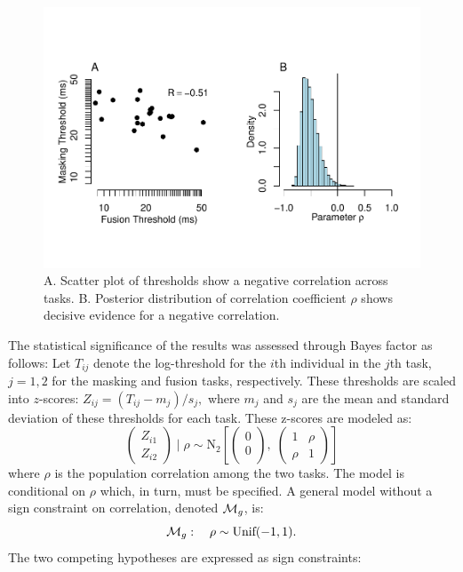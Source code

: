 \documentclass[
  ,man]{apa6}
\begin{document}
\begin{figure}[h]
\includegraphics{p_files/figure-latex/results-1} \caption{A. Scatter plot of thresholds show a negative correlation across tasks.  B. Posterior distribution of correlation coefficient $\rho$ shows decisive evidence for a negative correlation.}\label{fig:results}
\end{figure}

The statistical significance of the results was assessed through Bayes factor as follows: Let \(T_{ij}\) denote the log-threshold for the \(i\)th individual in the \(j\)th task, \(j=1,2\) for the masking and fusion tasks, respectively. These thresholds are scaled into \(z\)-scores: \(Z_{ij}=(T_{ij}-m_j)/s_j,\) where \(m_j\) and \(s_j\) are the mean and standard deviation of these thresholds for each task. These z-scores are modeled as:
\[
\begin{pmatrix} Z_{i1}\\ Z_{i2} \end{pmatrix} \mid \rho \sim \mbox{N}_2\left[
\begin{pmatrix} 0 \\ 0 \\ \end{pmatrix}, \;
\begin{pmatrix} 1 & \rho\\ \rho & 1\end{pmatrix}
\right]
\]
where \(\rho\) is the population correlation among the two tasks. The model is conditional on \(\rho\) which, in turn, must be specified. A general model without a sign constraint on correlation, denoted \({\cal M}_g\), is:
\[
{\cal M}_g: \quad \rho \sim \mbox{Unif}(-1,1).
\]
The two competing hypotheses are expressed as sign constraints:
\end{document}
